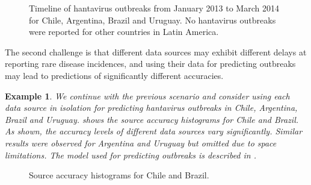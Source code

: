 \documentclass[twoside,leqno,twocolumn]{article}
\newtheorem{example}{Example}
\begin{document}
\begin{figure}[t]
\begin{center}
\end{center}
\caption{Timeline of hantavirus outbreaks from January 2013 to March 2014 for Chile, Argentina, Brazil and Uruguay. No hantavirus outbreaks were reported for other countries in Latin America.}
\label{fig:hanta_timelines}
\end{figure}

The second challenge is that different data sources may exhibit different delays at reporting rare disease incidences, and using their data for predicting outbreaks may lead to predictions of significantly different accuracies. 

\begin{example}
We continue with the previous scenario and consider using each data source in isolation for predicting hantavirus outbreaks in Chile, Argentina, Brazil and Uruguay.  shows the source accuracy histograms for Chile and Brazil. As shown, the accuracy levels of different data sources vary significantly. Similar results were observed for Argentina and Uruguay but omitted due to space limitations. The model used for predicting outbreaks is described in .
\end{example}

\begin{figure}[ht]
\captionsetup{font=scriptsize}
\begin{center}
\end{center}
\vspace{-10pt}
\caption{Source accuracy histograms for Chile and Brazil.}
\vspace{-10pt}
\label{fig:src_char}
\end{figure}
\end{document}
